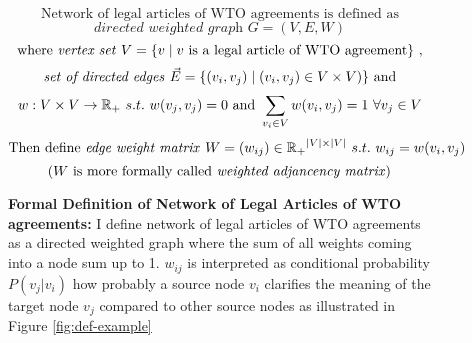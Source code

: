 \begin{figure}[ht]
    \[\text{Network of legal articles of WTO agreements is defined as}\] %
    \[ \textit{directed weighted graph }G = (V, E, W) \]
    \[\text{ where \textit{vertex set} } V = \{v \mid v\text{ is a legal article of WTO agreement}\}  \text{ , } \]
    \[\text{ \textit{set of directed edges }}\vec{E} = \{(v_i, v_j) \mid (v_i, v_j)\in V \times V)\} \text{ and } \]
    \[w : V \times V \to \Bbb R_{+} \text{ } s.t. \text{ } w(v_j, v_j) = 0 \text{ and } \sum_{v_i\in V}{w(v_i, v_j)} = 1 \text{  } \forall v_j \in V \]%
    \[\text{Then define \textit{edge weight matrix }}W=(w_{ij}) \in \Bbb{R_{+}}^{|V| \times |V|} \text{ } s.t. \text{ } w_{ij} = w(v_i, v_j) \] %
    \[(W \text{ is more formally called \textit{weighted adjancency matrix}})\]
    \caption{\textbf{Formal Definition of Network of Legal Articles of WTO agreements: }I define network of legal articles of WTO agreements
        as a directed weighted graph where the sum of all weights coming into a node sum up to 1. $w_{ij}$ is interpreted as conditional probability $P(v_j|v_i)$ how probably a source node $v_i$ clarifies the meaning of the target node $v_j$ compared to other source nodes as illustrated in Figure \ref{fig:def-example}}
    \label{fig:def}
\end{figure}

